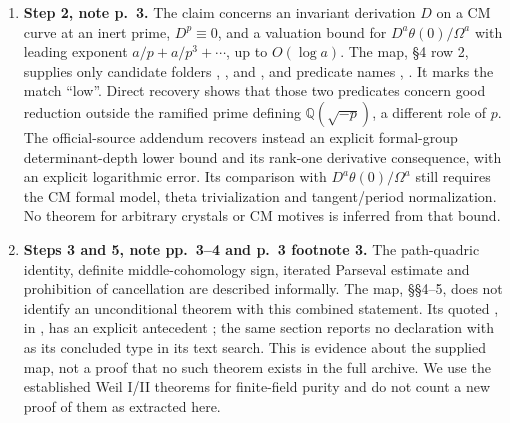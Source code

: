 \documentclass[11pt,a4paper]{article}
\theoremstyle{definition}
\begin{document}
\begin{enumerate}
\item \textbf{Step 2, note p.~3.} The claim concerns an invariant derivation
\(D\) on a CM curve at an inert prime, \(D^p\equiv0\), and a valuation bound
for \(D^a\theta(0)/\Omega^a\) with leading exponent
\(a/p+a/p^3+\cdots\), up to \(O(\log a)\).
The map, \S4 row 2, supplies only candidate folders
,
, and , and
predicate names , .
It marks the match ``low''.  Direct recovery shows that those two predicates
concern good reduction outside the ramified prime defining
\(\mathbb Q(\sqrt{-p})\), a different role of \(p\).  The official-source
addendum recovers instead an explicit formal-group determinant-depth lower
bound and its rank-one derivative consequence, with an explicit logarithmic
error.  Its comparison with \(D^a\theta(0)/\Omega^a\) still requires the
CM formal model, theta trivialization and tangent/period normalization.
No theorem for arbitrary crystals or CM motives is inferred from that bound.

\item \textbf{Steps 3 and 5, note pp.~3--4 and p.~3 footnote 3.}
The path-quadric identity, definite middle-cohomology sign, iterated Parseval
estimate and prohibition of cancellation are described informally.  The map,
\S\S4--5, does not identify an unconditional theorem with this combined
statement.  Its quoted , in
, has
an explicit antecedent ; the same section reports no declaration
with  as its concluded type in its text search.  This is evidence
about the supplied map, not a proof that no such theorem exists in the full
archive.  We use the established Weil I/II theorems for finite-field purity and
do not count a new proof of them as extracted here.


\end{enumerate}
\end{document}

